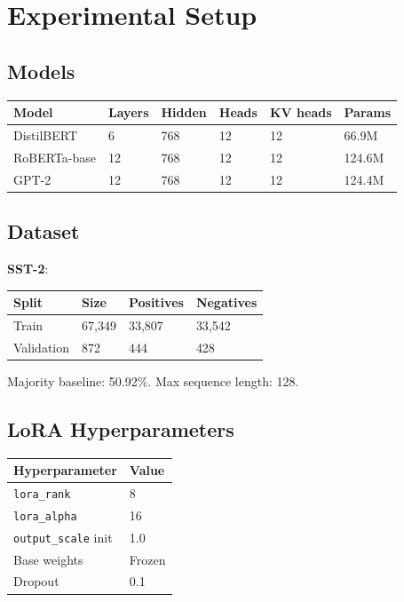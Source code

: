 \section{Experimental Setup}

\subsection{Models}

\begin{table}[H]
\centering
\small
\begin{tabular}{llllll}
\toprule
\textbf{Model} & \textbf{Layers} & \textbf{Hidden} & \textbf{Heads} & \textbf{KV heads} & \textbf{Params} \\
\midrule
DistilBERT & 6 & 768 & 12 & 12 & 66.9M \\
RoBERTa-base & 12 & 768 & 12 & 12 & 124.6M \\
GPT-2 & 12 & 768 & 12 & 12 & 124.4M \\
\bottomrule
\end{tabular}
\end{table}

\subsection{Dataset}

\textbf{SST-2}:

\begin{table}[H]
\centering
\small
\begin{tabular}{llll}
\toprule
\textbf{Split} & \textbf{Size} & \textbf{Positives} & \textbf{Negatives} \\
\midrule
Train & 67,349 & 33,807 & 33,542 \\
Validation & 872 & 444 & 428 \\
\bottomrule
\end{tabular}
\end{table}

Majority baseline: 50.92\%. Max sequence length: 128.

\subsection{LoRA Hyperparameters}

\begin{table}[H]
\centering
\small
\begin{tabular}{ll}
\toprule
\textbf{Hyperparameter} & \textbf{Value} \\
\midrule
\texttt{lora\_rank} & 8 \\
\texttt{lora\_alpha} & 16 \\
\texttt{output\_scale} init & 1.0 \\
Base weights & Frozen \\
Dropout & 0.1 \\
\bottomrule
\end{tabular}
\end{table}

